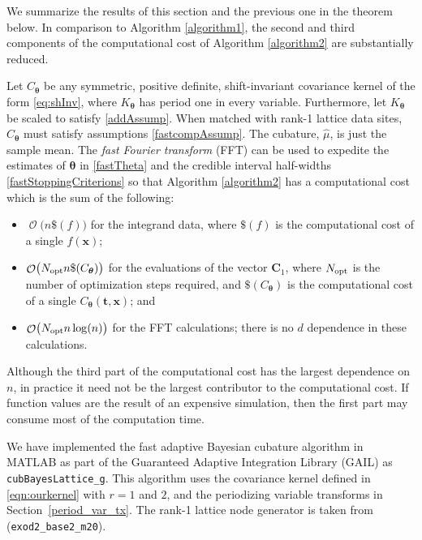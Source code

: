 \documentclass[twocolumn]{svjour3}          %
\DeclareMathOperator{\Order}{{\mathcal O}}
\newcommand{\bm}[1]{\boldsymbol{#1}}
\newcommand{\vtheta}{{\bm{\theta}}}
\newcommand{\vC}{\bm{C}}
\newcommand{\vt}{\bm{t}}
\newcommand{\vx}{\bm{x}}
\newcommand{\opt}{{\textup{opt}}}
\newcommand{\hmu}{\widehat{\mu}}
\newcommand{\code}[1]{\texttt{#1}}
\newcommand\secref{Section~\ref}
\begin{document}
We summarize the results of this section and the previous one in the theorem below.  In comparison to Algorithm \ref{algorithm1}, the second and third components of the computational cost of Algorithm  \ref{algorithm2} are substantially reduced.
\begin{theorem}
Let $C_\vtheta$ be any symmetric, positive definite,  shift-invariant covariance kernel of the form \eqref{eq:shInv}, where $K_\vtheta$ has period one in every variable.  Furthermore, let $K_\vtheta$ be scaled to satisfy \eqref{addAssump}.  When matched with rank-1 lattice data sites, $C_\vtheta$ must satisfy assumptions \eqref{fastcompAssump}.  The cubature, $\hmu$, is just the sample mean.  The \emph{fast Fourier transform} (FFT) can be used to expedite the estimates of $\vtheta$ in \eqref{fastTheta} and the credible interval half-widths \eqref{fastStoppingCriterions} so that Algorithm \ref{algorithm2} has a computational cost which is the sum of the following:
\begin{itemize}
	\item $\Order\bigl(n\$(f) \bigr)$ for the integrand data, where $\$(f)$ is the computational cost of a single $f(\vx)$;
	
	\item $\Order\bigl(N_{\opt} n \$(C_\vtheta) \bigr)$ for the evaluations of the vector $\vC_{1}$, where $N_\opt$ is the number of optimization steps required, and  $\$(C_\vtheta)$ is the computational cost of a single $C_\vtheta(\vt,\vx)$; and
	
	\item $\Order\bigl(N_{\opt} n \log(n) \bigr)$ for the FFT calculations; there is no $d$ dependence in these calculations.
	
\end{itemize}

\end{theorem}

Although the third part of the computational cost has the largest dependence on $n$, in practice it need not be the largest contributor to the computational cost.  If function values are the result of an expensive simulation, then the first part may consume most of the computation time.

We have implemented the fast adaptive Bayesian cubature algorithm in MATLAB as part of the Guaranteed Adaptive Integration Library (GAIL) \cite{ChoEtal17b} as \linebreak[4]  \code{cubBayesLattice\_g}. This algorithm uses the covariance kernel defined in \eqref{eqn:ourkernel} with  $r=1$ and $2$, and the periodizing variable transforms in  \secref{period_var_tx}.  The rank-1 lattice node generator is taken from \cite{Nuy17a} \linebreak[4] (\code{exod2\_base2\_m20}).
\end{document}
